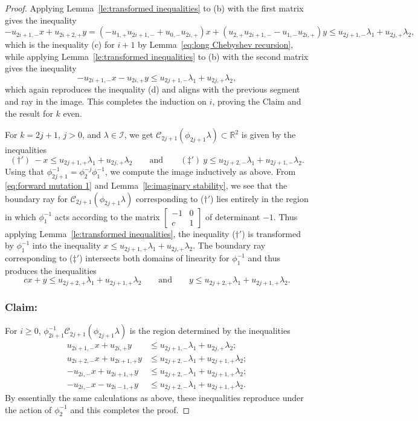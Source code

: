 \documentclass{amsart}
\numberwithin{theorem}{section}
\newcommand{\cC}{\mathcal{C}}
\newcommand{\cI}{\mathcal{I}}
\newcommand{\RR}{\mathbb{R}}
\begin{document}
\begin{proof}
    Applying Lemma~\ref{le:transformed inequalities} to (b) with the first matrix gives the inequality 
    \[-u_{2i+1,-}x+u_{2i+2,+}y=(-u_{1,+}u_{2i+1,-}+u_{0,-}u_{2i,+})x+(u_{2,+}u_{2i+1,-}-u_{1,-}u_{2i,+})y\le u_{2j+1,-}\lambda_1+u_{2j,+}\lambda_2,\]
    which is the inequality (c) for $i+1$ by Lemma~\ref{eq:long Chebyshev recursion}, while applying Lemma~\ref{le:transformed inequalities} to (b) with the second matrix gives the inequality 
    \[-u_{2i+1,-}x-u_{2i,+}y\le u_{2j+1,-}\lambda_1+u_{2j,+}\lambda_2,\]
    which again reproduces the inequality (d) and aligns with the previous segment and ray in the image.
    This completes the induction on $i$, proving the Claim and the result for $k$ even.

    For $k=2j+1$, $j>0$, and $\lambda\in\cI$, we get $\cC_{2j+1}(\phi_{2j+1}\lambda)\subset\RR^2$ is given by the inequalities 
    \[ (\dagger')\ -x\le u_{2j+1,+}\lambda_1+u_{2j,+}\lambda_2 \qquad\text{and}\qquad (\ddagger')\ y\le u_{2j+2,-}\lambda_1+u_{2j+1,-}\lambda_2.\]
    Using that $\phi_{2j+1}^{-1}=\phi_2^{-j}\phi_1^{-1}$, we compute the image inductively as above.
    From \eqref{eq:forward mutation 1} and Lemma~\ref{le:imaginary stability}, we see that the boundary ray for $\cC_{2j+1}(\phi_{2j+1}\lambda)$ corresponding to ($\dagger'$) lies entirely in the region in which $\phi_1^{-1}$ acts according to the matrix $\left[ \begin{array}{cc} -1 & 0\\ c & 1 \end{array}\right]$ of determinant $-1$.
    Thus applying Lemma~\ref{le:transformed inequalities}, the inequality ($\dagger'$) is transformed by $\phi_1^{-1}$ into the inequality $x\le u_{2j+1,+}\lambda_1+u_{2j,+}\lambda_2$.
    The boundary ray corresponding to ($\ddagger'$) intersects both domains of linearity for $\phi_1^{-1}$ and thus produces the inequalities
    \[ cx+y\le u_{2j+2,+}\lambda_1+u_{2j+1,+}\lambda_2 \qquad\text{and}\qquad  y\le u_{2j+2,+}\lambda_1+u_{2j+1,+}\lambda_2.\]


    \subsubsection*{Claim:} For $i\ge 0$, $\phi_{2i+1}^{-1}\cC_{2j+1}(\phi_{2j+1}\lambda)$ is the region determined by the inequalities 
    \begin{align*}
      \tag{a$'$} u_{2i+1,-}x+u_{2i,+}y &\le u_{2j+1,-}\lambda_1+u_{2j,+}\lambda_2;\\
      \tag{b$'$} u_{2i+2,-}x+u_{2i+1,+}y &\le u_{2j+2,-}\lambda_1+u_{2j+1,+}\lambda_2;\\
      \tag{c$'$} -u_{2i,-}x+u_{2i+1,+}y &\le u_{2j+2,-}\lambda_1+u_{2j+1,+}\lambda_2;\\
      \tag{d$'$} -u_{2i,-}x-u_{2i-1,+}y &\le u_{2j+2,-}\lambda_1+u_{2j+1,+}\lambda_2.
    \end{align*}
    By essentially the same calculations as above, these inequalities reproduce under the action of $\phi_2^{-1}$ and this completes the proof.
  \end{proof}
\end{document}
